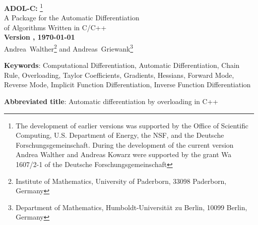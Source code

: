 \documentclass[11pt,twoside]{article}
\begin{document}
\begin{titlepage}
\begin{center}
{\Large {\bf ADOL-C:}} 
\footnote{The development of earlier versions was supported by the Office of
  Scientific Computing, U.S. Department of Energy, the NSF, and the Deutsche
  Forschungsgemeinschaft. During the development of the current
  version Andrea Walther and Andreas Kowarz were supported by the
  grant Wa 1607/2-1 of the Deutsche Forschungsgemeinschaft}  
\vspace{0.2in} \\
%
{\Large A Package for the Automatic Differentiation}\vspace{0.1in} \\
{\Large of Algorithms Written in C/C++}\\
\vspace{.2in}
{\large\bf  Version \packageversion, \monthyear\today} \\
\bigskip
 \mbox{Andrea Walther}\footnote{Institute of Mathematics, University
   of Paderborn, 33098 Paderborn, Germany} and
 \mbox{Andreas Griewank}\footnote{Department of Mathematics,
 Humboldt-Universit\"at zu Berlin, 10099 Berlin, Germany}
\end{center}
%
\begin{abstract}
The C++ package ADOL-C described here facilitates the evaluation of
first and higher derivatives of vector functions that are defined
by computer programs written in C or C++. The resulting derivative
evaluation routines may be called from C, C++, Fortran, or any other
language that can be linked with C.

The numerical values of derivative vectors are obtained free
of truncation errors at a small multiple of the run time and
random access memory required by the given function evaluation program.
Derivative matrices are obtained by columns, by rows or in sparse format. 
For solution curves defined by ordinary differential equations,
special routines are provided that evaluate the Taylor coefficient vectors
and their Jacobians with respect to the current state vector.
For explicitly or implicitly defined functions derivative tensors are 
obtained with a complexity that grows only quadratically in their
degree. The derivative calculations involve a possibly substantial but
always predictable amount of data. Since the data is accessed strictly sequentially 
it can be automatically paged out to external files. 
\end{abstract}
%
{\bf Keywords}: Computational Differentiation, Automatic 
         Differentiation,
         Chain Rule, Overloading, Taylor Coefficients, 
         Gradients, Hessians, Forward Mode, Reverse Mode,
         Implicit Function Differentiation, Inverse Function Differentiation 
\medskip

\noindent
{\bf Abbreviated title}: Automatic differentiation by overloading in C++
%
\end{titlepage}
%
\tableofcontents       
%
\end{document}
